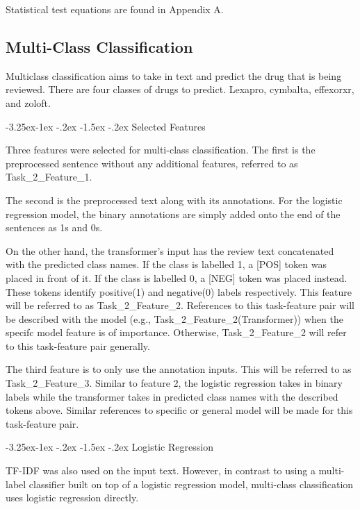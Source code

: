 \documentclass[10.7pt, onecolumn]{article}
\makeatletter
\renewcommand\subsubsection{\@startsection{subsubsection}{3}{\z@}%
	{-3.25ex\@plus -1ex \@minus -.2ex}%
    {-1.5ex \@plus -.2ex}%
    {\normalfont\itshape}}
\makeatother
\begin{document}
Statistical test equations are found in Appendix A.
\subsection{Multi-Class Classification}
Multiclass classification aims to take in text and predict the drug that is being reviewed. There are four classes of drugs to predict. Lexapro, cymbalta, effexorxr, and zoloft.

\subsubsection{Selected Features}

Three features were selected for multi-class classification. The first is the preprocessed sentence without any additional features, referred to as Task\_2\_Feature\_1. 

The second is the preprocessed text along with its annotations. For the logistic regression model, the binary annotations are simply added onto the end of the sentences as 1s and 0s. 

On the other hand, the transformer's input has the review text concatenated with the predicted class names. If the class is labelled 1, a [POS] token was placed in front of it. If the class is labelled 0, a [NEG] token was placed instead. These tokens identify positive(1) and negative(0) labels respectively. This feature will be referred to as Task\_2\_Feature\_2. References to this task-feature pair will be described with the model (e.g., Task\_2\_Feature\_2(Transformer)) when the specifc model feature is of importance. Otherwise, Task\_2\_Feature\_2 will refer to this task-feature pair generally.

The third feature is to only use the annotation inputs. This will be referred to as Task\_2\_Feature\_3. Similar to feature 2, the logistic regression takes in binary labels while the transformer takes in predicted class names with the described tokens above. Similar references to specific or general model will be made for this task-feature pair.

\subsubsection{Logistic Regression}

TF-IDF was also used on the input text. However, in contrast to using a multi-label classifier built on top of a logistic regression model, multi-class classification uses logistic regression directly.
\end{document}
